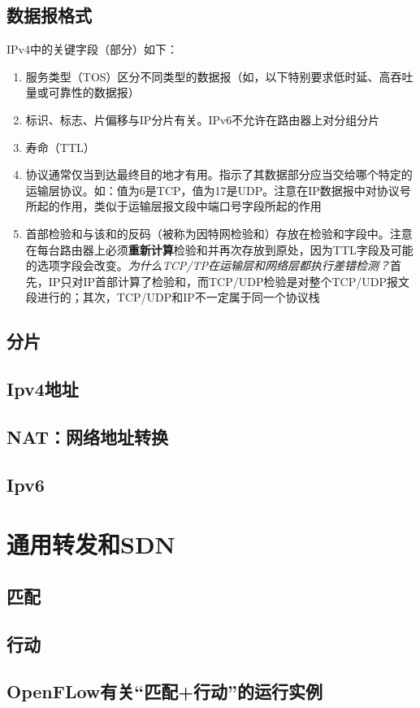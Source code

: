 \documentclass[]{report}
\begin{document}
		\subsection{数据报格式}
		IPv4中的关键字段（部分）如下：
		\begin{enumerate}
			\item 服务类型（TOS）区分不同类型的数据报（如，以下特别要求低时延、高吞吐量或可靠性的数据报）
			\item 标识、标志、片偏移与IP分片有关。IPv6不允许在路由器上对分组分片
			\item 寿命（TTL）
			\item 协议通常仅当到达最终目的地才有用。指示了其数据部分应当交给哪个特定的运输层协议。如：值为6是TCP，值为17是UDP。注意在IP数据报中对协议号所起的作用，类似于运输层报文段中端口号字段所起的作用
			\item 首部检验和与该和的反码（被称为因特网检验和）存放在检验和字段中。注意在每台路由器上必须\textbf{重新计算}检验和并再次存放到原处，因为TTL字段及可能的选项字段会改变。\textit{为什么TCP/TP在运输层和网络层都执行差错检测？}首先，IP只对IP首部计算了检验和，而TCP/UDP检验是对整个TCP/UDP报文段进行的；其次，TCP/UDP和IP不一定属于同一个协议栈
		\end{enumerate}
		\subsection{分片}
		\subsection{Ipv4地址}
		\subsection{NAT：网络地址转换}
		\subsection{Ipv6}
	\section{通用转发和SDN}
		\subsection{匹配}
		\subsection{行动}
		\subsection{OpenFLow有关“匹配+行动”的运行实例}
\end{document}
